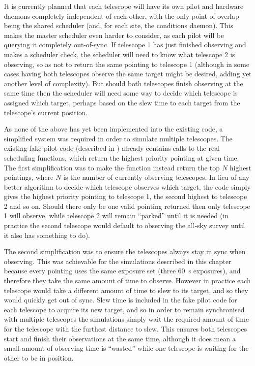 \begin{colsection}
\begin{colsection}
It is currently planned that each telescope will have its own pilot and hardware daemons completely independent of each other, with the only point of overlap being the shared scheduler (and, for each site, the conditions daemon). This makes the master scheduler even harder to consider, as each pilot will be querying it completely out-of-sync. If telescope 1 has just finished observing and makes a scheduler check, the scheduler will need to know what telescope 2 is observing, so as not to return the same pointing to telescope 1 (although in some cases having both telescopes observe the same target might be desired, adding yet another level of complexity). But should both telescopes finish observing at the same time then the scheduler will need some way to decide which telescope is assigned which target, perhaps based on the slew time to each target from the telescope's current position.

As none of the above has yet been implemented into the existing code, a simplified system was required in order to simulate multiple telescopes. The existing fake pilot code (described in ) already contains calls to the real scheduling functions, which return the highest priority pointing at given time. The first simplification was to make the function instead return the top $N$ highest pointings, where $N$ is the number of currently observing telescopes. In lieu of any better algorithm to decide which telescope observes which target, the code simply gives the highest priority pointing to telescope 1, the second highest to telescope 2 and so on. Should there only be one valid pointing returned then only telescope 1 will observe, while telescope 2 will remain ``parked'' until it is needed (in practice the second telescope would default to observing the all-sky survey until it also has something to do).

The second simplification was to ensure the telescopes always stay in sync when observing. This was achievable for the simulations described in this chapter because every pointing uses the same exposure set (three \SI{60}{\second} exposures), and therefore they take the same amount of time to observe. However in practice each telescope would take a different amount of time to slew to its target, and so they would quickly get out of sync. Slew time is included in the fake pilot code for each telescope to acquire its new target, and so in order to remain synchronised with multiple telescopes the simulations simply wait the required amount of time for the telescope with the furthest distance to slew. This ensures both telescopes start and finish their observations at the same time, although it does mean a small amount of observing time is ``wasted'' while one telescope is waiting for the other to be in position.


\end{colsection}
\end{colsection}
